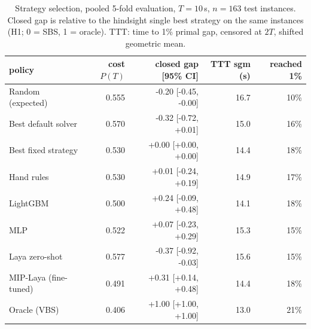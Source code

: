 \begin{table}[t]\centering\small
\begin{tabular}{lrrrr}
\toprule
policy & cost $P(T)$ & closed gap [95\% CI] & TTT sgm (s) & reached 1\% \\
\midrule
Random (expected) & 0.555 & -0.20 [-0.45, -0.00] & 16.7 & 10\% \\
Best default solver & 0.570 & -0.32 [-0.72, +0.01] & 15.0 & 16\% \\
Best fixed strategy & 0.530 & +0.00 [+0.00, +0.00] & 14.4 & 18\% \\
Hand rules & 0.530 & +0.01 [-0.24, +0.19] & 14.9 & 17\% \\
LightGBM & 0.500 & +0.24 [-0.09, +0.48] & 14.1 & 18\% \\
MLP & 0.522 & +0.07 [-0.23, +0.29] & 15.3 & 15\% \\
Laya zero-shot & 0.577 & -0.37 [-0.92, -0.03] & 15.6 & 15\% \\
MIP-Laya (fine-tuned) & 0.491 & +0.31 [+0.14, +0.48] & 14.4 & 18\% \\
Oracle (VBS) & 0.406 & +1.00 [+1.00, +1.00] & 13.0 & 21\% \\
\bottomrule
\end{tabular}
\caption{Strategy selection, pooled 5-fold evaluation, $T=10$\,s, $n=163$ test instances. Closed gap is relative to the hindsight single best strategy on the same instances (H1; 0 = SBS, 1 = oracle). TTT: time to 1\% primal gap, censored at $2T$, shifted geometric mean.}\label{tab:sel-pooled-10}
\end{table}